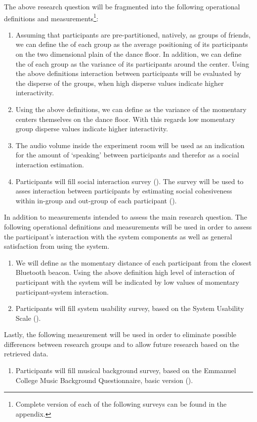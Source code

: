 The above research question will be fragmented into the following operational definitions and measurements\footnote{Complete version of each of the following surveys can be found in the appendix.}:
\begin{enumerate}
	\item \label{measure:disperse} Assuming that participants are pre-partitioned, natively, as groups of friends, we can define the  of each group as the average positioning of its participants on the two dimensional plain of the dance floor. In addition, we can define the  of each group as the variance of its participants around the center. Using the above definitions interaction between participants will be evaluated by the disperse of the groups, when high disperse values indicate higher interactivity.
	\item \label{measure:groups} Using the above definitions, we can define  as the variance of the momentary centers themselves on the dance floor. With this regards low momentary group disperse values indicate higher interactivity.
	\item \label{measure:audio} The audio volume inside the experiment room will be used as an indication for the amount of `speaking' between participants and therefor as a social interaction estimation.
	\item \label{measure:survey:social} Participants will fill social interaction survey (). The survey will be used to asses interaction between participants by estimating social cohesiveness within in-group and out-group of each participant ().
\end{enumerate}
In addition to measurements intended to assess the main research question. The following operational definitions and measurements will be used in order to assess the participant's interaction with the system components as well as general satisfaction from using the system.
\begin{enumerate}[resume]
	\item \label{measure:system} We will define  as the momentary distance of each participant from the closest Bluetooth beacon. Using the above definition high level of interaction of participant with the system will be indicated by low values of momentary participant-system interaction.
	\item \label{measure:survey:usability} Participants will fill system usability survey, based on the System Usability Scale (\cite{brooke96}).
\end{enumerate}
Lastly, the following measurement will be used in order to eliminate possible differences between research groups and to allow future research based on the retrieved data.
\begin{enumerate}[resume]
	\item \label{measure:survey:musical} Participants will fill musical background survey, based on the Emmanuel College Music Background Questionnaire, basic version (\cite{zhao12}).
\end{enumerate}

